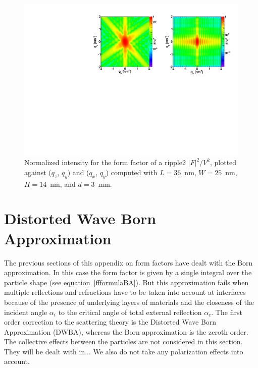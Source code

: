 \begin{figure}[h]
\begin{center}
\includegraphics[width=\textwidth]{Figures/figffripple2}
\end{center}
\caption{Normalized intensity for the form factor of a ripple2
  $|F|^2/V^2$, plotted against ($q_z$, $q_y$) and  ($q_x$, $q_y$)
  computed with $L=36$~nm, $W=25$~nm, $H=14$~nm, and $d=3$~mm.}
\label{fig:FFripple2Ex}
\end{figure}

\FloatBarrier


\newpage{\cleardoublepage}
\section{Distorted Wave Born Approximation}

The previous sections of this appendix on form factors have dealt with the Born approximation. In this case the form factor is given by a single integral over the particle shape (see equation~\ref{ffformulaBA}). But this approximation fails when multiple reflections and refractions have to be taken into account at interfaces because of the presence of underlying layers of materials and the closeness of  the incident angle $\alpha_i$ to the critical angle of total external reflection $\alpha_c$. The first order correction to the scattering theory is the Distorted Wave Born Approximation (DWBA), whereas the Born approximation is the zeroth order. \\
The collective effects between the particles are not considered in this section. They will be dealt with in...  We also do not take any polarization effects into account.\\

